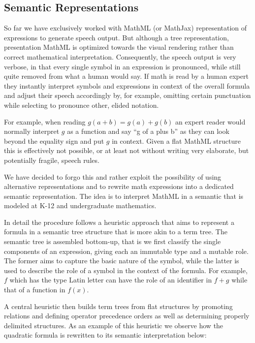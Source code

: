 \documentclass{sig-alternate}
\begin{document}
\subsection{Semantic Representations}
\label{sec:semantic}

So far we have exclusively worked with MathML (or MathJax) representation of
expressions to generate speech output. But although a tree representation,
presentation MathML is optimized towards the visual rendering rather than
correct mathematical interpretation.  Consequently, the speech output is very
verbose, in that every single symbol in an expression is pronounced, while still
quite removed from what a human would say. If math is read by a human
expert they instantly interpret symbols and expressions in context of the
overall formula and adjust their speech accordingly by, for example, omitting
certain punctuation while selecting to pronounce other, elided notation.

For example, when reading $g(a+b)=g(a) + g(b)$ an expert reader would normally
interpret $g$ as a function and say ``g of a plus b'' as they can look beyond the
equality sign and put $g$ in context. Given a flat MathML structure this is
effectively not possible, or at least not without writing very elaborate, but
potentially fragile, speech rules.

We have decided to forgo this and rather exploit the possibility of using
alternative representations and to rewrite math expressions into a dedicated
semantic representation.  The idea is to interpret MathML in a semantic that
is modeled at K-12 and undergraduate mathematics.

In detail the procedure follows a heuristic approach that aims to represent a
formula in a semantic tree structure that is more akin to a term tree. The
semantic tree is assembled bottom-up, that is we first classify the single
components of an expression, giving each an immutable type and a mutable
role. The former aims to capture the basic nature of the symbol, while the
latter is used to describe the role of a symbol in the context of the formula.
For example, $f$ which has the type Latin letter can have the role of an
identifier in $f + g$ while that of a function in $f(x)$.

A central heuristic then builds term trees from flat structures by promoting
relations and defining operator precedence orders as well as determining
properly delimited structures. As an example of this heuristic we observe how the quadratic
formula is rewritten to its semantic interpretation below:
\end{document}
